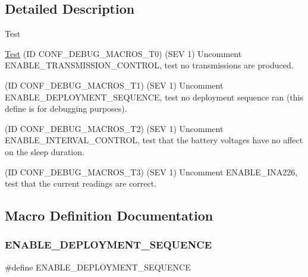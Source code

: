 \subsection{Detailed Description}
\begin{DoxyRefDesc}{Test}
\item[\hyperlink{test__test000016}{Test}](ID C\+O\+N\+F\+\_\+\+D\+E\+B\+U\+G\+\_\+\+M\+A\+C\+R\+O\+S\+\_\+\+T0) (S\+EV 1) Uncomment E\+N\+A\+B\+L\+E\+\_\+\+T\+R\+A\+N\+S\+M\+I\+S\+S\+I\+O\+N\+\_\+\+C\+O\+N\+T\+R\+OL, test no transmissions are produced. 

(ID C\+O\+N\+F\+\_\+\+D\+E\+B\+U\+G\+\_\+\+M\+A\+C\+R\+O\+S\+\_\+\+T1) (S\+EV 1) Uncomment E\+N\+A\+B\+L\+E\+\_\+\+D\+E\+P\+L\+O\+Y\+M\+E\+N\+T\+\_\+\+S\+E\+Q\+U\+E\+N\+CE, test no deployment sequence ran (this define is for debugging purposes). 

(ID C\+O\+N\+F\+\_\+\+D\+E\+B\+U\+G\+\_\+\+M\+A\+C\+R\+O\+S\+\_\+\+T2) (S\+EV 1) Uncomment E\+N\+A\+B\+L\+E\+\_\+\+I\+N\+T\+E\+R\+V\+A\+L\+\_\+\+C\+O\+N\+T\+R\+OL, test that the battery voltages have no affect on the sleep duration. 

(ID C\+O\+N\+F\+\_\+\+D\+E\+B\+U\+G\+\_\+\+M\+A\+C\+R\+O\+S\+\_\+\+T3) (S\+EV 1) Uncomment E\+N\+A\+B\+L\+E\+\_\+\+I\+N\+A226, test that the current readings are correct.\end{DoxyRefDesc}


\subsection{Macro Definition Documentation}
\mbox{\label{group__defines__debug__macros_ga0a56ed473e6b28f5f47a91daad56691b}} 
\subsubsection{\texorpdfstring{E\+N\+A\+B\+L\+E\+\_\+\+D\+E\+P\+L\+O\+Y\+M\+E\+N\+T\+\_\+\+S\+E\+Q\+U\+E\+N\+CE}{ENABLE\_DEPLOYMENT\_SEQUENCE}}
{\footnotesize\ttfamily \#define E\+N\+A\+B\+L\+E\+\_\+\+D\+E\+P\+L\+O\+Y\+M\+E\+N\+T\+\_\+\+S\+E\+Q\+U\+E\+N\+CE}

